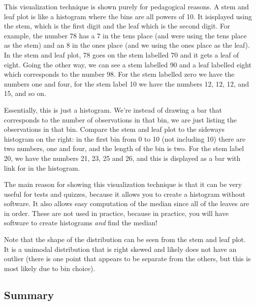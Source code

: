 \documentclass[
  letterpaper,
  DIV=11,
  numbers=noendperiod]{scrreprt}
\begin{document}
This visualization technique is shown purely for pedagogical reasons. A
stem and leaf plot is like a histogram where the bins are all powers of
10. It isisplayed using the stem, which is the first digit and the leaf
which is the second digit. For example, the number 78 has a 7 in the
tens place (and were using the tens place as the stem) and an 8 in the
ones place (and we using the ones place as the leaf). In the stem and
leaf plot, 78 goes on the stem labelled 70 and it gets a leaf of eight.
Going the other way, we can see a stem labelled 90 and a leaf labelled
eight which corresponds to the number 98. For the stem labelled zero we
have the numbers one and four, for the stem label 10 we have the numbers
12, 12, 12, and 15, and so on.

Essentially, this is just a histogram. We're instead of drawing a bar
that corresponds to the number of observations in that bin, we are just
listing the observations in that bin. Compare the stem and leaf plot to
the sideways histogram on the right: in the first bin from 0 to 10 (not
including 10) there are two numbers, one and four, and the length of the
bin is two. For the stem label 20, we have the numbers 21, 23, 25 and
26, and this is displayed as a bar with link for in the histogram.

The main reason for showing this visualization technique is that it can
be very useful for tests and quizzes, because it allows you to create a
histogram without software. It also allows easy computation of the
median since all of the leaves are in order. These are not used in
practice, because in practice, you will have software to create
histograms \emph{and} find the median!

Note that the shape of the distribution can be seen from the stem and
leaf plot. It is a unimodal distribution that is right skewed and likely
does not have an outlier (there is one point that appears to be separate
from the others, but this is most likely due to bin choice).

\hypertarget{summary}{%
\subsection{Summary}\label{summary}}
\end{document}
